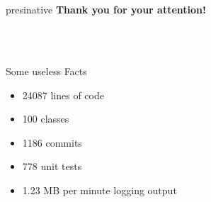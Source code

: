 \documentclass[hyperref={pdfpagelabels=false},compress]{beamer}
\begin{document}
\section{}
\begin{frame}
	\hfill
	\begin{beamercolorbox}[shadow=true, rounded=true, wd=10cm]{presinative}
		\centering
		\Large{\textbf{Thank you for your attention!}}
	\end{beamercolorbox}
	\hfill \\
	\hfill \\
	\begin{block}{Some useless Facts}
		\begin{itemize}
			\item 24087 lines of code
			\item 100 classes
			\item 1186 commits
			\item 778 unit tests
			\item 1.23 MB per minute logging output
		\end{itemize}
	\end{block}
\end{frame}
\end{document}
